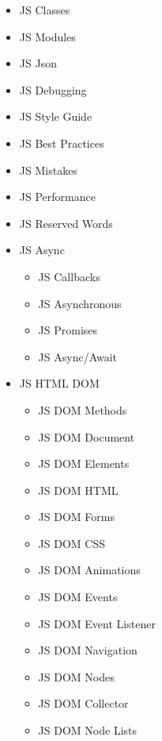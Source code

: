 \documentclass[12pt, letterpaper]{article}
\begin{document}
\begin{enumerate}
\begin{itemize}
\begin{enumerate}
\begin{itemize}
                \item JS Classes
                \item JS Modules
                \item JS Json
                \item JS Debugging
                \item JS Style Guide
                \item JS Best Practices
                \item JS Mistakes
                \item JS Performance
                \item JS Reserved Words
                \item JS Async
                \begin{itemize}
                    \item JS Callbacks
                    \item JS Asynchronous
                    \item JS Promises
                    \item JS Async/Await
                \end{itemize}
                \item JS HTML DOM
                \begin{itemize}
                    \item JS DOM Methods
                    \item JS DOM Document
                    \item JS DOM Elements
                    \item JS DOM HTML
                    \item JS DOM Forms
                    \item JS DOM CSS
                    \item JS DOM Animations
                    \item JS DOM Events
                    \item JS DOM Event Listener
                    \item JS DOM Navigation
                    \item JS DOM Nodes
                    \item JS DOM Collector
                    \item JS DOM Node Lists
                \end{itemize}
            \end{itemize}
        \end{enumerate}

\end{itemize}
\end{enumerate}
\end{document}
